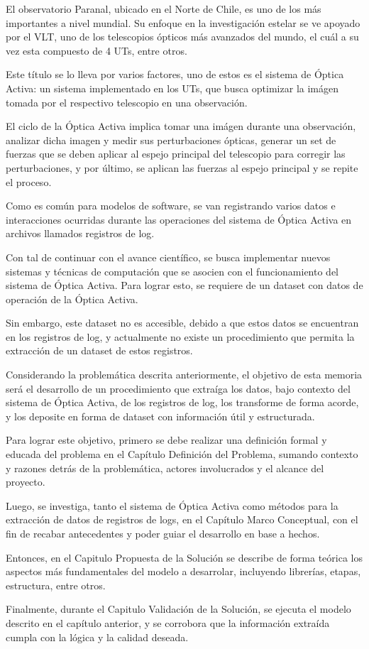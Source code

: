
El observatorio Paranal, ubicado en el Norte de Chile, es uno de los más importantes a nivel mundial. Su enfoque en la investigación estelar se ve apoyado por el VLT, uno de los telescopios ópticos más avanzados del mundo, el cuál a su vez esta compuesto de 4 UTs, entre otros.

Este título se lo lleva por varios factores, uno de estos es el sistema de Óptica Activa: un sistema implementado en los UTs, que busca optimizar la imágen tomada por el respectivo telescopio en una observación.

El ciclo de la Óptica Activa implica tomar una imágen durante una observación, analizar dicha imagen y medir sus perturbaciones ópticas, generar un set de fuerzas que se deben aplicar al espejo principal del telescopio para corregir las perturbaciones, y por último, se aplican las fuerzas al espejo principal y se repite el proceso.

Como es común para modelos de software, se van registrando varios datos e interacciones ocurridas durante las operaciones del sistema de Óptica Activa en archivos llamados registros de log.

Con tal de continuar con el avance científico, se busca implementar nuevos sistemas y técnicas de computación que se asocien con el funcionamiento del sistema de Óptica Activa. Para lograr esto, se requiere de un dataset con datos de operación de la Óptica Activa.

Sin embargo, este dataset no es accesible, debido a que estos datos se encuentran en los registros de log, y actualmente no existe un procedimiento que permita la extracción de un dataset de estos registros.

Considerando la problemática descrita anteriormente, el objetivo de esta memoria será el desarrollo de un procedimiento que extraíga los datos, bajo contexto del sistema de Óptica Activa, de los registros de log, los transforme de forma acorde, y los deposite en forma de dataset con información útil y estructurada.

Para lograr este objetivo, primero se debe realizar una definición formal y educada del problema en el Capítulo Definición del Problema, sumando contexto y razones detrás de la problemática, actores involucrados y el alcance del proyecto.

Luego, se investiga, tanto el sistema de Óptica Activa como métodos para la extracción de datos de registros de logs, en el Capítulo Marco Conceptual, con el fin de recabar antecedentes y poder guiar el desarrollo en base a hechos.

Entonces, en el Capitulo Propuesta de la Solución se describe de forma teórica los aspectos más fundamentales del modelo a desarrolar, incluyendo librerías, etapas, estructura, entre otros.

Finalmente, durante el Capitulo Validación de la Solución, se ejecuta el modelo descrito en el capítulo anterior, y se corrobora que la información extraída cumpla con la lógica y la calidad deseada.